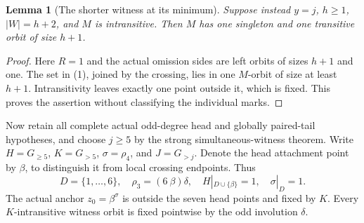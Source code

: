 \documentclass[11pt,a4paper]{article}
\newtheorem{lemma}{Lemma}
\begin{document}
\begin{lemma}[The shorter witness at its minimum]
Suppose instead $y=j$, $h\ge1$, $|W|=h+2$,
and $M$ is intransitive. Then $M$ has one
singleton and one transitive orbit of size $h+1$.
\end{lemma}
\begin{proof}
Here $R=1$ and the actual omission sides are
left orbits of sizes $h+1$ and one. The set
in (1), joined by the crossing, lies in one
$M$-orbit of size at least $h+1$. Intransitivity
leaves exactly one point outside it, which
is fixed. This proves the assertion without
classifying the individual marks.
\end{proof}

Now retain all complete actual odd-degree head
and globally paired-tail hypotheses, and choose
$j\ge5$ by the strong simultaneous-witness theorem.
Write $H=G_{\ge5}$, $K=G_{>5}$, $\sigma=\rho_4$,
and $J=G_{>j}$. Denote the head attachment point
by $\beta$, to distinguish it from local crossing
endpoints. Thus
\[
 D=\{1,\ldots,6\},\quad \rho_3=(6\ \beta)\delta,
 \quad H|_{D\cup\{\beta\}}=1,\quad \sigma|_D=1.
\]
The actual anchor $z_0=\beta^\sigma$ is outside
the seven head points and fixed by $K$. Every
$K$-intransitive witness orbit is fixed pointwise
by the odd involution $\delta$.
\end{document}
